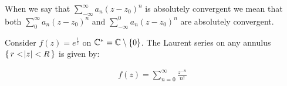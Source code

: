 \begin{note}
When we say that $\sum_{-\infty}^\infty a_n (z-z_0)^n$ is absolutely convergent we mean that both $\sum_{0}^\infty a_n (z-z_0)^n$ and $\sum_{-\infty}^0 a_n (z-z_0)^n$ are absolutely convergent.
\end{note}

\begin{example}
Consider $f(z) = e^{\frac{1}{z}}$ on $\mathbb{C}^* = \mathbb{C} \setminus \{ 0 \}$. The Laurent series on any annulus $\set{r < \abs{z} < R}$ is given by:

\begin{align*}
    f(z) = \sum_{n=0}^\infty \frac{z^{-n}}{n!}
\end{align*}

\end{example}

